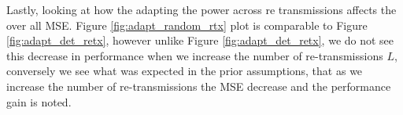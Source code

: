 \documentclass{article}
\begin{document}
Lastly, looking at how the adapting the power across re transmissions affects the over all MSE. Figure \ref{fig:adapt_random_rtx} plot is comparable to Figure \ref{fig:adapt_det_retx}, however unlike Figure \ref{fig:adapt_det_retx}, we do not see this decrease in performance when we increase the number of re-transmissions $L$, conversely we see what was expected in the prior assumptions, that as we increase the number of re-transmissions the MSE decrease and the performance gain is noted. 


\end{document}
